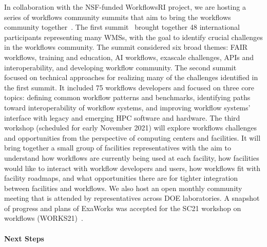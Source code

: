 In collaboration with the NSF-funded WorkflowsRI project, we are hosting a
series of workflows community summits that aim to bring the workflows
community together~\cite{dasilva2021community}. The first
summit~\cite{summit-1} brought together 48 international participants
representing many WMSs, with the goal to identify crucial challenges in the
workflows community. The summit considered six broad themes: FAIR workflows,
training and education, AI workflows, exascale challenges, APIs and
interoperability, and developing workflow community. The second
summit~\cite{summit-2} focused on technical approaches for realizing many of
the challenges identified in the first summit. It included 75 workflows
developers %
and focused on three core topics: defining common workflow patterns and
benchmarks, identifying paths toward interoperability of workflow systems, and
improving workflow systems' interface with legacy and emerging HPC software
and hardware. The third workshop (scheduled for early November 2021) will
explore workflows challenges and opportunities from the perspective of
computing centers and facilities.  It will bring together a small group of
facilities representatives with the aim to understand how workflows are
currently being used at each facility, how facilities would like to interact
with workflow developers and users, how workflows fit with facility roadmaps,
and what opportunities there are for tighter integration between facilities
and workflows. We also host an open monthly community meeting that is attended
by representatives across DOE laboratories. A snapshot of progress and plans
of ExaWorks was accepted for the SC21 workshop on workflows
(WORKS21)~\cite{alsaadi2021exaworks}.


\paragraph{Next Steps}



